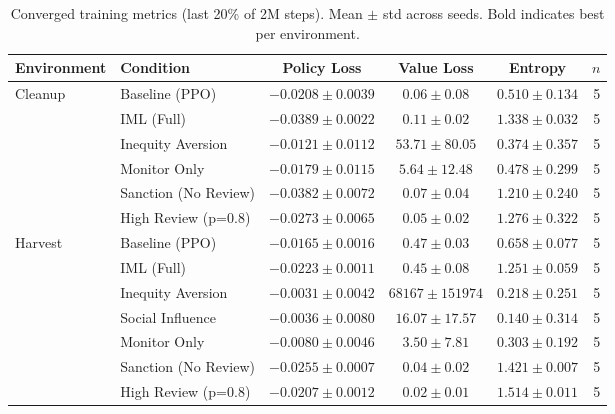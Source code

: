 \begin{table}[htbp]
\centering
\caption{Converged training metrics (last 20\% of 2M steps). Mean $\pm$ std across seeds. Bold indicates best per environment.}
\label{tab:training_metrics}
\begin{tabular}{llcccr}
\toprule
Environment & Condition & Policy Loss & Value Loss & Entropy & $n$ \\
\midrule
  Cleanup & Baseline (PPO) & $-0.0208 \pm 0.0039$ & $0.06 \pm 0.08$ & $0.510 \pm 0.134$ & 5 \\
   & IML (Full) & $-0.0389 \pm 0.0022$ & $0.11 \pm 0.02$ & $1.338 \pm 0.032$ & 5 \\
   & Inequity Aversion & $-0.0121 \pm 0.0112$ & $53.71 \pm 80.05$ & $0.374 \pm 0.357$ & 5 \\
   & Monitor Only & $-0.0179 \pm 0.0115$ & $5.64 \pm 12.48$ & $0.478 \pm 0.299$ & 5 \\
   & Sanction (No Review) & $-0.0382 \pm 0.0072$ & $0.07 \pm 0.04$ & $1.210 \pm 0.240$ & 5 \\
   & High Review (p=0.8) & $-0.0273 \pm 0.0065$ & $0.05 \pm 0.02$ & $1.276 \pm 0.322$ & 5 \\
\midrule
  Harvest & Baseline (PPO) & $-0.0165 \pm 0.0016$ & $0.47 \pm 0.03$ & $0.658 \pm 0.077$ & 5 \\
   & IML (Full) & $-0.0223 \pm 0.0011$ & $0.45 \pm 0.08$ & $1.251 \pm 0.059$ & 5 \\
   & Inequity Aversion & $-0.0031 \pm 0.0042$ & $68167 \pm 151974$ & $0.218 \pm 0.251$ & 5 \\
   & Social Influence & $-0.0036 \pm 0.0080$ & $16.07 \pm 17.57$ & $0.140 \pm 0.314$ & 5 \\
   & Monitor Only & $-0.0080 \pm 0.0046$ & $3.50 \pm 7.81$ & $0.303 \pm 0.192$ & 5 \\
   & Sanction (No Review) & $-0.0255 \pm 0.0007$ & $0.04 \pm 0.02$ & $1.421 \pm 0.007$ & 5 \\
   & High Review (p=0.8) & $-0.0207 \pm 0.0012$ & $0.02 \pm 0.01$ & $1.514 \pm 0.011$ & 5 \\
\bottomrule
\end{tabular}
\end{table}
